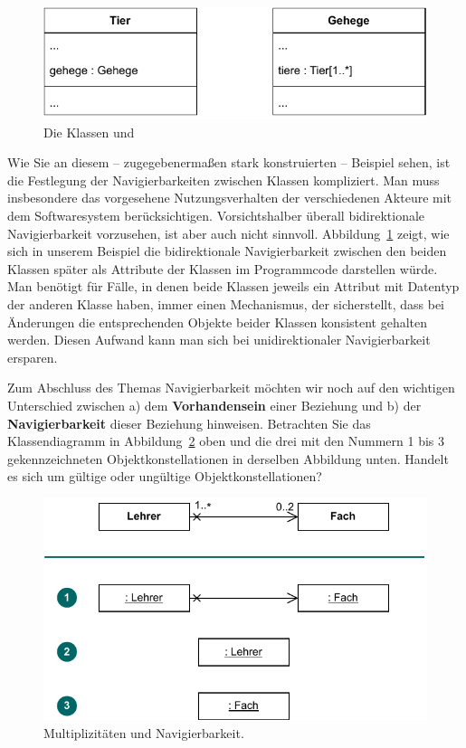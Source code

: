 \begin{figure}[h!]
	\centering
	\includegraphics[scale=1.0]{Bilder/Kapitel-8/klassen_tier_und_gehege.pdf}
	\caption{Die Klassen  und }
	\label{fig:klassen_tier_und_gehege}
\end{figure}

Wie Sie an diesem -- zugegebenermaßen stark konstruierten -- Beispiel sehen, ist die Festlegung der Navigierbarkeiten zwischen Klassen kompliziert. Man muss insbesondere das vorgesehene Nutzungsverhalten der verschiedenen Akteure mit dem Softwaresystem berücksichtigen. Vorsichtshalber überall bidirektionale Navigierbarkeit vorzusehen, ist aber auch nicht sinnvoll. Abbildung~\ref{fig:klassen_tier_und_gehege} zeigt, wie sich in unserem Beispiel die bidirektionale Navigierbarkeit zwischen den beiden Klassen später als Attribute der Klassen im Programmcode darstellen würde. Man benötigt für Fälle, in denen beide Klassen jeweils ein Attribut mit Datentyp der anderen Klasse haben, immer einen Mechanismus, der sicherstellt, dass bei Änderungen die entsprechenden Objekte beider Klassen konsistent gehalten werden. Diesen Aufwand kann man sich bei unidirektionaler Navigierbarkeit ersparen.

Zum 
Abschluss des Themas Navigierbarkeit möchten wir noch auf den wichtigen Unterschied zwischen a) dem \textbf{Vorhandensein} einer Beziehung und b) der \textbf{Navi\-gierbar\-keit} dieser Beziehung hinweisen. Betrachten Sie das Klassendiagramm in Abbildung~\ref{fig:multiplizitaeten_und_navigierbarkeit} oben und die drei mit den Nummern 1 bis 3 gekennzeichneten Objekt\-konstella\-tionen in derselben Abbildung unten. Handelt es sich um gültige oder ungültige Objektkonstellationen?

\begin{figure}[h!]
	\centering
	\includegraphics[scale=1.0]{Bilder/Kapitel-8/multiplizitaeten_und_navigierbarkeit.pdf}
	\caption{Multiplizitäten und Navigierbarkeit.}
	\label{fig:multiplizitaeten_und_navigierbarkeit}
\end{figure}

